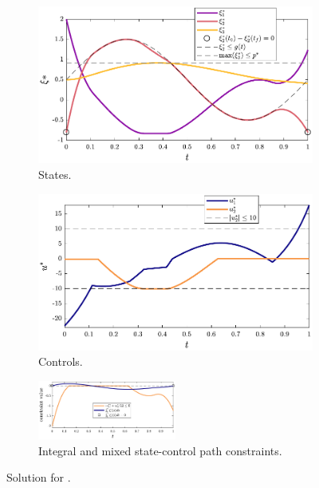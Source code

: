 \begin{figure}
\centering

\begin{subfigure}{0.5\textwidth}
\centering
\includegraphics[width=\textwidth]{../ch5/figures/ex5sol-states}%
\caption{States.}
\label{fig:ch5:ex5sol:states}
\end{subfigure}%
\begin{subfigure}{0.5\textwidth}
\centering
\includegraphics[width=\textwidth]{../ch5/figures/ex5sol-controls}%
\caption{Controls.}
\label{fig:ch5:ex5sol:controls}
\end{subfigure}%

\begin{subfigure}{\textwidth}
\centering
\includegraphics[width=0.5\textwidth]{../ch5/figures/ex5sol-other}%
\caption{Integral and mixed state-control path constraints.}
\label{fig:ch5:ex5sol:other}
\end{subfigure}%

\caption{Solution for .}
\label{fig:ch5:ex5sens}
\end{figure}